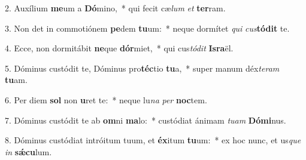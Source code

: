 2. Auxílium \textbf{me}um a \textbf{Dó}mino,~*  qui fecit cæ\textit{lum} \textit{et} \textbf{ter}ram.\

3. Non det in commotiónem \textbf{pe}dem \textbf{tu}um:~*  neque dormítet \textit{qui} \textit{cus}\textbf{tó}\textbf{dit} te.\

4. Ecce, non dormitábit \textbf{ne}que \textbf{dór}miet,~*  qui cus\textit{tó}\textit{dit} \textbf{Is}\textbf{ra}ël.\

5. Dóminus custódit te, Dóminus pro\textbf{téc}tio \textbf{tu}a,~*  super manum déx\textit{te}\textit{ram} \textbf{tu}am.\

6. Per diem \textbf{sol} non \textbf{u}ret te:~*  neque lu\textit{na} \textit{per} \textbf{noc}tem.\

7. Dóminus custódit te ab \textbf{om}ni \textbf{ma}lo:~*  custódiat ánimam \textit{tu}\textit{am} \textbf{Dó}\textbf{mi}nus.\

8. Dóminus custódiat intróitum tuum, et \textbf{éx}itum \textbf{tu}um:~*  ex hoc nunc, et us\textit{que} \textit{in} \textbf{sǽ}\textbf{cu}lum.\

